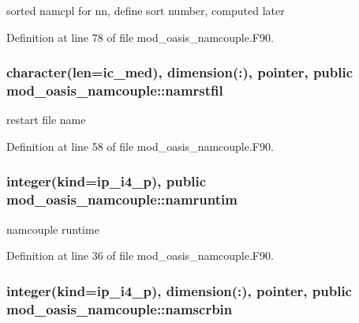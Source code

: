 sorted namcpl for nn, define sort number, computed later 



Definition at line 78 of file mod\+\_\+oasis\+\_\+namcouple.\+F90.

\hypertarget{classmod__oasis__namcouple_a54f4b8262f809a20928092782bc78345}{
\subsubsection[{namrstfil}]{\setlength{\rightskip}{0pt plus 5cm}character(len=ic\+\_\+med), dimension(\+:), pointer, public mod\+\_\+oasis\+\_\+namcouple\+::namrstfil}}\label{classmod__oasis__namcouple_a54f4b8262f809a20928092782bc78345}


restart file name 



Definition at line 58 of file mod\+\_\+oasis\+\_\+namcouple.\+F90.

\hypertarget{classmod__oasis__namcouple_a14505eaa91b2c8ba308c63ff78652206}{
\subsubsection[{namruntim}]{\setlength{\rightskip}{0pt plus 5cm}integer(kind=ip\+\_\+i4\+\_\+p), public mod\+\_\+oasis\+\_\+namcouple\+::namruntim}}\label{classmod__oasis__namcouple_a14505eaa91b2c8ba308c63ff78652206}


namcouple runtime 



Definition at line 36 of file mod\+\_\+oasis\+\_\+namcouple.\+F90.

\hypertarget{classmod__oasis__namcouple_a728405e8f669b58d00c189abf8b62437}{
\subsubsection[{namscrbin}]{\setlength{\rightskip}{0pt plus 5cm}integer(kind=ip\+\_\+i4\+\_\+p), dimension(\+:), pointer, public mod\+\_\+oasis\+\_\+namcouple\+::namscrbin}}\label{classmod__oasis__namcouple_a728405e8f669b58d00c189abf8b62437}


